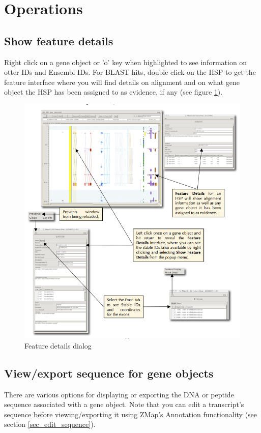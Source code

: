 \documentclass[letterpaper]{article}
\begin{document}
\clearpage
\section{Operations}

\subsection{Show feature details}
Right click on a gene object or 'o' key when highlighted to see information on otter IDs and Ensembl IDs. For BLAST hits, double click on the HSP to get the feature interface where you will find details on alignment and on what gene object the HSP has been assigned to as evidence, if any (see figure \ref{img_feature_details_dialog}).

\begin{figure}
\centering
\color[rgb]{0.30980393,0.5058824,0.7411765}
\includegraphics[width=15.231cm]{img_feature_details_dialog.png}
\caption{Feature details dialog}
\label{img_feature_details_dialog}
\end{figure}


\subsection{View/export sequence for gene objects} \label{sec_view_export_sequence}
There are various options for displaying or exporting the DNA or peptide sequence associated with a gene object. Note that you can edit a transcript's sequence before viewing/exporting it using ZMap's Annotation functionality (see section \ref{sec_edit_sequence}).
\end{document}
